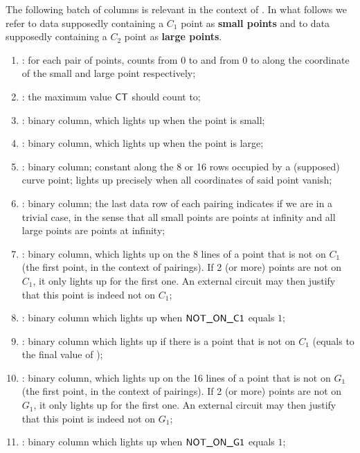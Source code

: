The following batch of columns is relevant in the context of .
In what follows we refer to data supposedly containing a $C_1$ point as \textbf{small points} and to data supposedly containing a $C_2$ point as \textbf{large points}.
\begin{enumerate}[resume]
      \item \ct:
            for each pair of points, counts from 0 to \ctMaxSmallPoint{} and from 0 to \ctMaxLargePoint{} %
            along the coordinate of the small and large point respectively;
      \item \maxCt:
            the maximum value $\textsf{CT}$ should count to;
      \item \isSmallPoint:
            binary column, which lights up when the point is small;
      \item \isLargePoint:
            binary column, which lights up when the point is large;
      \item \isInfinity:
            binary column;
            constant along the 8 or 16 rows occupied by a (supposed) curve point;
            lights up precisely when all coordinates of said point vanish;
      \item \both{\trivialPairing}: binary column; the last data row of each pairing indicates if we are in a trivial case, in the sense that all small points are points at infinity and all large points are points at infinity;
      \item \notOnCOne{} \blsPrediction{}: binary column, which lights up on the 8 lines of a point that is not on $C_1$ (the first point, in the context of pairings). If 2 (or more) points are not on $C_1$, it only lights up for the first one. An external circuit may then justify that this point is indeed not on $C_1$;       
      \item \notOnCOneAcc: binary column which lights up when $\textsf{NOT\_ON\_C1}$ equals $1$;
      \item \notOnCOneAccMax: binary column which lights up if there is a point that is not on $C_1$ (equals to the final value of \notOnCOneAcc);
      \item \notOnGOne{ }\blsPrediction{}: binary column, which lights up on the 16 lines of a point that is not on $G_1$ (the first point, in the context of pairings). If 2 (or more) points are not on $G_1$, it only lights up for the first one. An external circuit may then justify that this point is indeed not on $G_1$;
      \item \notOnGOneAcc: binary column which lights up when $\textsf{NOT\_ON\_G1}$ equals $1$;

\end{enumerate}
